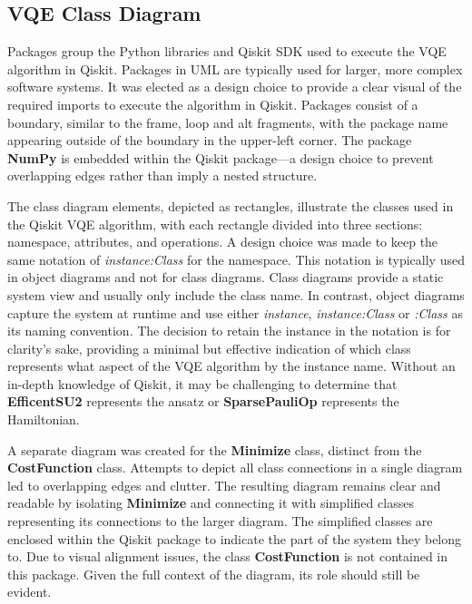 \documentclass{article}
\begin{document}
\subsection{VQE Class Diagram}

Packages group the Python libraries and Qiskit SDK used to execute the VQE algorithm in Qiskit. Packages in UML are typically used for larger, more complex software systems\cite{VisualParadigm}. It was elected as a design choice to provide a clear visual of the required imports to execute the algorithm in Qiskit. Packages consist of a boundary, similar to the frame, loop and alt fragments, with the package name appearing outside of the boundary in the upper-left corner. The package \textbf{NumPy} is embedded within the Qiskit package—a design choice to prevent overlapping edges rather than imply a nested structure.

The class diagram elements, depicted as rectangles, illustrate the classes used in the Qiskit VQE algorithm, with each rectangle divided into three sections: namespace, attributes, and operations. A design choice was made to keep the same notation of \textit{instance:Class} for the namespace. This notation is typically used in object diagrams and not for class diagrams. Class diagrams provide a static system view and usually only include the class name. In contrast, object diagrams capture the system at runtime and use either \textit{instance}, \textit{instance:Class} or \textit{:Class} as its naming convention\cite{Seidl_Scholz_Huemer_Kappel_Duffy_2014}. The decision to retain the instance in the notation is for clarity's sake, providing a minimal but effective indication of which class represents what aspect of the VQE algorithm by the instance name. Without an in-depth knowledge of Qiskit, it may be challenging to determine that \textbf{EfficentSU2} represents the ansatz or \textbf{SparsePauliOp} represents the Hamiltonian.

A separate diagram was created for the \textbf{Minimize} class, distinct from the \textbf{CostFunction} class. Attempts to depict all class connections in a single diagram led to overlapping edges and clutter. The resulting diagram remains clear and readable by isolating \textbf{Minimize} and connecting it with simplified classes representing its connections to the larger diagram. The simplified classes are enclosed within the Qiskit package to indicate the part of the system they belong to. Due to visual alignment issues, the class \textbf{CostFunction} is not contained in this package. Given the full context of the diagram, its role should still be evident. 
\end{document}
